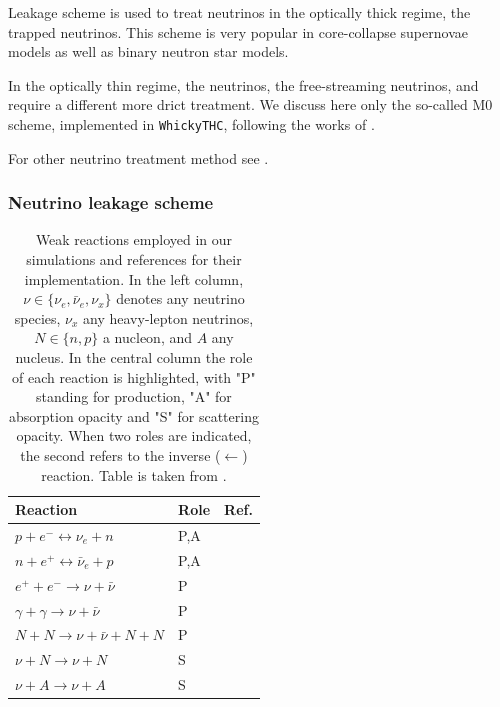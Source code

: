 \documentclass[11pt,a4paper,headinclude=true,DIV=14,BCOR=8mm,chapterprefix,listof=totoc,twoside,openright,abstracton]{scrbook}
\begin{document}
Leakage scheme is used to treat neutrinos in the optically thick regime, the trapped neutrinos.
This scheme is very popular in core-collapse supernovae models as well as binary neutron star models.
\cite{vanRiper:1981mko,Ruffert:1995fs,Rosswog:2003rv,OConnor:2009iuz,Perego:2015agy}

In the optically thin regime, the neutrinos, the free-streaming neutrinos, and require a different more drict treatment. 
We discuss here only the so-called M0 scheme, implemented in \texttt{WhickyTHC}, following the works of \cite{Radice:2016dwd,Radice:2018pdn}.

For other neutrino treatment method see \cite{vanRiper:1981mko,Ruffert:1995fs,Rosswog:2003rv,OConnor:2009iuz,Sekiguchi:2010ep,Neilsen:2014hha,Perego:2015agy,Ardevol-Pulpillo:2018btx}.


\subsubsection{Neutrino leakage scheme}


\begin{table}
    \caption{
        Weak reactions employed in our simulations and references for their implementation.
        In the left column, $\nu \in \{\nu_e, \bar{\nu}_e, \nu_{x}\}$ denotes any neutrino species, 
        $\nu_{x}$ any heavy-lepton neutrinos, $N \in\{n, p\}$ a nucleon, and $A$ any nucleus.
        In the central column the role of each reaction is highlighted, with "P" standing for 
        production, "A" for absorption opacity and "S" for scattering opacity. When two roles are
        indicated, the second refers to the inverse ($\leftarrow$) reaction.
        Table is taken from \cite{Radice:2018pdn}.
    }
    \label{tab:leakage}
    \begin{center}
        \begin{tabular}{lll}
            \hline\hline
            Reaction & Role &  Ref. \\ 
            \hline
            $p + e^- \leftrightarrow \nu_e + n $          & P,A & \cite{Bruenn:1985}  \\
            $n + e^+ \leftrightarrow \bar{\nu}_{e} + p $  & P,A & \cite{Bruenn:1985}  \\
            $e^+ + e^- \rightarrow \nu + \bar{\nu}$       & P & \cite{Ruffert:1995fs} \\
            $\gamma + \gamma \rightarrow \nu + \bar{\nu}$ & P & \cite{Ruffert:1995fs} \\
            $N + N \rightarrow \nu + \bar{\nu} + N  + N$  & P & \cite{Burrows:2004vq} \\
            $\nu + N \rightarrow \nu + N$                 & S & \cite{Ruffert:1995fs} \\
            $\nu + A \rightarrow \nu + A$                 & S & \cite{Shapiro:1983du} \\
            \hline\hline
        \end{tabular}
    \end{center}
\end{table}
\end{document}
